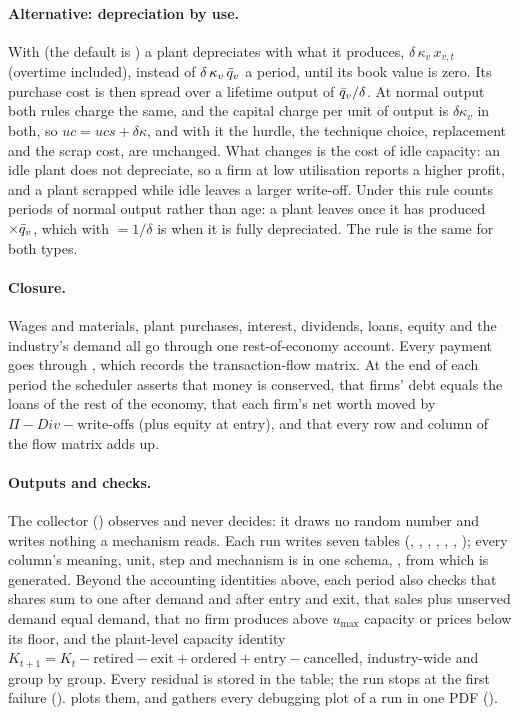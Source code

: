 \paragraph{Alternative: depreciation by use.} With  (the default
is ) a plant depreciates with what it produces, $\delta\,\kappa_v\,x_{v,t}$
(overtime included), instead of $\delta\,\kappa_v\,\bar q_v$ a period, until its book value is
zero. Its purchase cost is then spread over a lifetime output of $\bar q_v/\delta$. At normal
output both rules charge the same, and the capital charge per unit of output is
$\delta\kappa_v$ in both, so $uc = ucs + \delta\kappa$, and with it the hurdle, the
technique choice, replacement and the scrap cost, are unchanged. What changes is the cost of
idle capacity: an idle plant does not depreciate, so a firm at low utilisation reports a
higher profit, and a plant scrapped while idle leaves a larger write-off. Under this rule
 counts periods of normal output rather than age: a plant leaves once it
has produced $\times\bar q_v$, which with  $= 1/\delta$ is
when it is fully depreciated. The rule is the same for both types.

\paragraph{Closure.} Wages and materials, plant purchases, interest, dividends, loans,
equity and the industry's demand all go through one rest-of-economy account. Every payment
goes through , which records the transaction-flow matrix. At the
end of each period the scheduler asserts that money is conserved, that firms' debt equals
the loans of the rest of the economy, that each firm's net worth moved by
$\Pi - \mathit{Div} - \text{write-offs}$ (plus equity at entry), and that every row and
column of the flow matrix adds up.

\paragraph{Outputs and checks.} The collector () observes and
never decides: it draws no random number and writes nothing a mechanism reads. Each run
writes seven tables (, , , ,
, , ); every column's meaning, unit, step and
mechanism is in one schema, , from which
 is generated. Beyond the accounting identities above, each
period also checks that shares sum to one after demand and after entry and exit, that
sales plus unserved demand equal demand, that no firm produces above $u_{\max}$ capacity
or prices below its floor, and the plant-level capacity identity
$K_{t+1} = K_t - \text{retired} - \text{exit} + \text{ordered} + \text{entry} -
\text{cancelled}$, industry-wide and group by group. Every residual is stored in the
 table; the run stops at the first failure ().
 plots them, and  gathers every debugging plot of a run in one PDF ().

